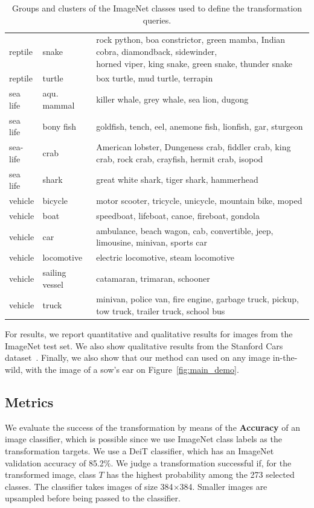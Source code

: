 \begin{table}
\begin{tabular}{lll}
reptile & snake & \makecell[l]{rock python, boa constrictor, green mamba, Indian cobra, diamondback, sidewinder, \\horned viper, king snake, green snake, thunder snake} \\
reptile & turtle & box turtle, mud turtle, terrapin \\
\midrule
sea life & aqu. mammal & killer whale, grey whale, sea lion, dugong \\
sea life & bony fish & goldfish, tench, eel, anemone fish, lionfish, gar, sturgeon \\
sea-life & crab & American lobster, Dungeness crab, fiddler crab, king crab, rock crab, crayfish, hermit crab, isopod \\
sea life & shark & great white shark, tiger shark, hammerhead \\
\midrule
vehicle & bicycle & motor scooter, tricycle, unicycle, mountain bike, moped \\
vehicle & boat & speedboat, lifeboat, canoe, fireboat, gondola \\
vehicle & car & ambulance, beach wagon, cab, convertible, jeep, limousine, minivan, sports car \\
vehicle & locomotive & electric locomotive, steam locomotive \\
vehicle & sailing vessel & catamaran, trimaran, schooner \\
vehicle & truck & minivan, police van, fire engine, garbage truck, pickup, tow truck, trailer truck, school bus \\
\bottomrule
\end{tabular}

\caption{Groups and clusters of the ImageNet classes used to define the transformation queries.
}
\label{fig:clusters} 
\end{table}


For results, we report quantitative and qualitative results for images from the ImageNet test set. 
We also show  qualitative results from the Stanford Cars dataset~\citep{KrauseStarkDengFei-Fei_3DRR2013}.
Finally, we also show that our method can used on any image in-the-wild, with the image of a 
sow's ear on Figure~\ref{fig:main_demo}.


\subsection{Metrics}
%
We  evaluate the success of the transformation by means of the \textbf{Accuracy} of an 
image  classifier, which is possible since we use ImageNet class labels as the 
transformation targets.
%
We use a DeiT \citep{touvron2021deit} classifier, which has an ImageNet validation 
accuracy of 85.2\%. 
We judge a transformation  successful if, for the transformed image, class $T$ has
 the highest  probability among the  273 selected classes.
The classifier takes images of size 384$\times$384. Smaller images are upsampled before 
being passed to the classifier.

